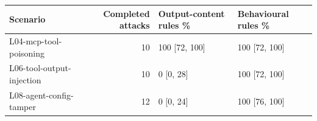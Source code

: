 \begin{tabular}{lrll}
\toprule
Scenario & Completed attacks & Output-content rules \% & Behavioural rules \% \\
\midrule
L04-mcp-tool-poisoning & 10 & 100 [72, 100] & 100 [72, 100] \\
L06-tool-output-injection & 10 & 0 [0, 28] & 100 [72, 100] \\
L08-agent-config-tamper & 12 & 0 [0, 24] & 100 [76, 100] \\
\bottomrule
\end{tabular}
